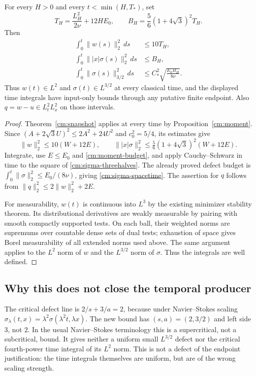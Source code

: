 \begin{corollary}
\label{cm:spacetime}
For every $H>0$ and every $t<\min(H,T_*)$, set
\[
 T_H=\frac{L_H^2}{2\nu}+12HE_0,
 \qquad B_H=\frac56(1+4\sqrt3)^2T_H.
\]
Then
\begin{align}
 \int_0^t\|w(s)\|_2^2\,ds&\le10T_H,\label{cm:w-budget}\\
 \int_0^t\||x|\sigma(s)\|_2^2\,ds&\le B_H,\label{cm:sigma-weight-budget}\\
 \int_0^t\|\sigma(s)\|_{3/2}^2\,ds
 &\le C_*^2\sqrt{\frac{E_0B_H}{8\nu}}.\label{cm:sigma-spacetime}
\end{align}
Thus $w(t)\in L^2$ and $\sigma(t)\in L^{3/2}$ at every classical time,
and the displayed time integrals have input-only bounds through any
putative finite endpoint. Also $q=w-u\in L^2_tL^2_x$ on those intervals.
\end{corollary}
\begin{proof}
Theorem~\ref{cm:snapshot} applies at every time by
Proposition~\ref{cm:moment}. Since
$(A+2\sqrt3 U)^2\le2A^2+24U^2$ and $c_0^2=5/4$, its estimates give
\[
 \|w\|_2^2\le10(W+12E),\qquad
 \||x|\sigma\|_2^2\le\tfrac56(1+4\sqrt3)^2(W+12E).
\]
Integrate, use $E\le E_0$ and \eqref{cm:moment-budget}, and apply
Cauchy--Schwarz in time to the square of
\eqref{cm:sigma-threehalves}. The already proved defect budget is
$\int_0^t\|\sigma\|_2^2\le E_0/(8\nu)$, giving
\eqref{cm:sigma-spacetime}. The assertion for $q$ follows from
$\|q\|_2^2\le2\|w\|_2^2+2E$.

For measurability, $w(t)$ is continuous into $L^3$ by the existing
minimizer stability theorem. Its distributional derivatives are weakly
measurable by pairing with smooth compactly supported tests. On each
ball, their weighted norms are supremums over countable dense sets of
dual tests; exhaustion of space gives Borel measurability of all extended
norms used above. The same argument applies to the $L^2$ norm of $w$ and
the $L^{3/2}$ norm of $\sigma$. Thus the integrals are well defined.
\end{proof}

\subsection{Why this does not close the temporal producer}

The critical defect line is $2/s+3/a=2$, because under Navier--Stokes
scaling $\sigma_\lambda(t,x)=\lambda^2\sigma(\lambda^2t,\lambda x)$.
The new bound has $(s,a)=(2,3/2)$ and left side $3$, not $2$.
In the usual Navier--Stokes terminology this is a supercritical,
not a subcritical, bound. It gives neither a uniform small $L^{3/2}$
defect nor the critical
fourth-power time integral of its $L^2$ norm. This is not a defect of the
endpoint justification: the time integrals themselves are uniform, but
are of the wrong scaling strength.

